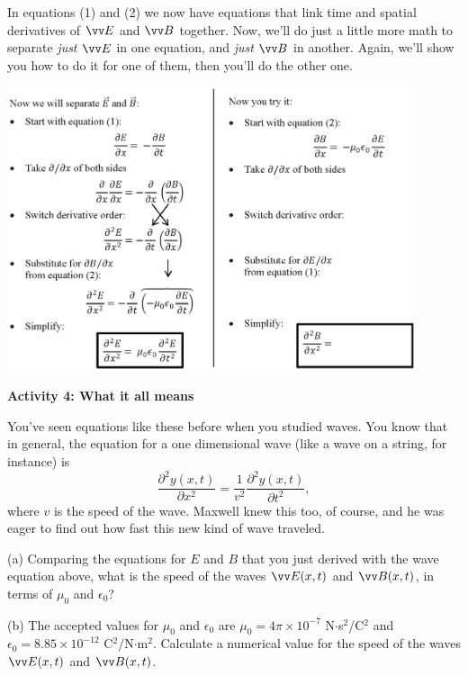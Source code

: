 In equations (1) and (2) we now have equations that link time and spatial derivatives of $\vv E$ and $\vv B$ together.  Now, we'll do just a little more math to separate \textit{just} $\vv E$ in one equation, and \textit{just} $\vv B$ in another.  Again, we'll show you how to do it for one of them, then you'll do the other one.
\vspace{-0.2in}

\begin{center}
    \includegraphics[width=0.9\textwidth]{deriving_em_waves/separate_E_and_B.eps} 
 \end{center}
\vspace{-0.2in}

\textbf{Activity 4: What it all means}

You've seen equations like these before when you studied waves.  You know that in general, the equation for a one dimensional wave (like a wave on a string, for instance) is
\begin{displaymath}
\frac{\partial^2y(x,t)}{\partial x^2}= \frac{1}{v^2} \frac{\partial^2y(x,t)}{\partial t^2},
\end{displaymath}
where $v$ is the speed of the wave.  Maxwell knew this too, of course, and he was eager to find out how fast this new kind of wave traveled.

(a) Comparing the equations for $E$ and $B$ that you just derived with the wave equation above, what is the speed of the waves $\vv E(x,t)$ and $\vv B(x,t)$, in terms of $\mu_0$ and $\epsilon_0$?
\vspace{0.5in}

(b)  The accepted values for $\mu_0$ and $\epsilon_0$ are $\mu_0=4\pi \times 10^{-7}$ N$\cdot$s$^2$/C$^2$ and 
$\epsilon_0=8.85 \times 10^{-12}$ C$^2$/N$\cdot $m$^2$.  Calculate a numerical value for the speed of the waves 
$\vv E(x,t)$ and $\vv B(x,t)$.
\vspace{0.5in}

